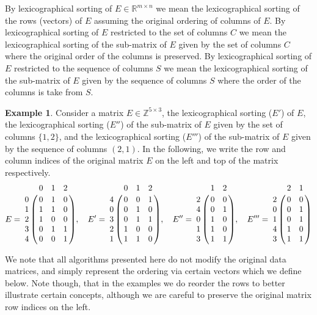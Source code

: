 \documentclass[a4paper,10pt,reqno]{amsart}
\newcommand\Z{\mathbb Z}
\newcommand\R{\mathbb R}
\theoremstyle{definition}
\newtheorem{example}{Example}
\begin{document}
By lexicographical sorting of $E \in \R^{m \times n}$ we mean the
lexicographical sorting of the rows (vectors) of $E$ assuming the original
ordering of columns of $E$. By lexicographical sorting of $E$ restricted to the
set of columns $C$ we mean the lexicographical sorting of the sub-matrix of $E$
given by the set of columns $C$ where the original order of the columns is preserved.
By lexicographical sorting of $E$ restricted to the sequence of columns $S$ we
mean the lexicographical sorting of the sub-matrix of $E$ given by the sequence
of columns $S$ where the order of the columns is take from $S$.

\begin{example}
Consider a matrix $E \in \Z^{5 \times 3}$, the lexicographical sorting ($E'$) of $E$,
the lexicographical sorting ($E''$) of the sub-matrix of $E$ given by the set
of columns $\{1,2\}$, and the lexicographical sorting ($E'''$) of the
sub-matrix of $E$ given by the sequence of columns $(2,1)$. In the following,
we write the row and column indices of the original matrix $E$ on the 
left and top of the matrix respectively.
$$E = 
\bordermatrix{
  & 0 & 1 & 2 \cr
0 & 0 & 1 & 0 \cr
1 & 1 & 1 & 0 \cr
2 & 1 & 0 & 0 \cr
3 & 0 & 1 & 1 \cr
4 & 0 & 0 & 1}, \quad
E' =
\bordermatrix{
  & 0 & 1 & 2 \cr
4 & 0 & 0 & 1 \cr
0 & 0 & 1 & 0 \cr
3 & 0 & 1 & 1 \cr
2 & 1 & 0 & 0 \cr
1 & 1 & 1 & 0}, \quad
E'' =
\bordermatrix{
  & 1 & 2 \cr
2 & 0 & 0 \cr
4 & 0 & 1 \cr
0 & 1 & 0 \cr
1 & 1 & 0 \cr
3 & 1 & 1 }, \quad
E''' = 
\bordermatrix{
  & 2 & 1 \cr
2 & 0 & 0 \cr
0 & 0 & 1 \cr
1 & 0 & 1 \cr
4 & 1 & 0 \cr 
3 & 1 & 1}
    $$
\end{example}

We note that all algorithms presented here do not modify the original
data matrices, and simply represent the ordering via certain vectors
which we define below. Note though, that in the examples we do reorder
the rows to better illustrate certain concepts, although we are careful
to preserve the original matrix row indices on the left.
\end{document}
